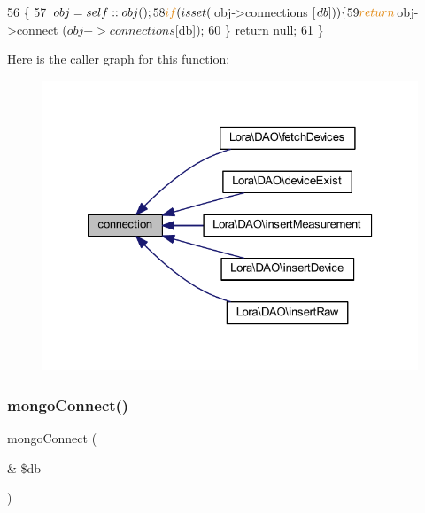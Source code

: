 \begin{DoxyCode}
56                                                    \{
57         $obj = self::obj ();
58         \textcolor{keywordflow}{if} (isset ($obj->connections [$db])) \{
59             \textcolor{keywordflow}{return} $obj->connect ($obj->connections  [$db]);
60         \} \textcolor{keywordflow}{return} null;
61     \}
\end{DoxyCode}
Here is the caller graph for this function\+:
\nopagebreak
\begin{figure}[H]
\begin{center}
\leavevmode
\includegraphics[width=326pt]{class_d_b_connection_aeb96471cf6f9d9205d22e8b17c2277c3_icgraph}
\end{center}
\end{figure}
\mbox{\label{class_d_b_connection_a4db4ce6ff1cf378867220c6694b8bc05}} 
\subsubsection{mongo\+Connect()}
{\footnotesize\ttfamily mongo\+Connect (\begin{DoxyParamCaption}\item[{\&}]{\$db }\end{DoxyParamCaption})\hspace{0.3cm}{\ttfamily [private]}}

